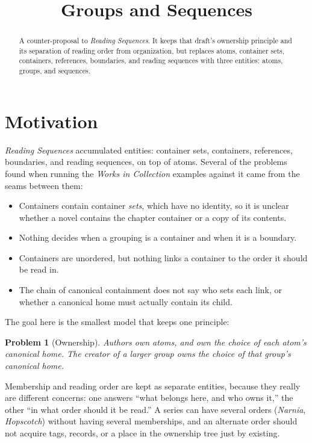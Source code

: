 \documentclass{amsart}
\title{Groups and Sequences}
\newtheorem*{prob}{Problem}
\theoremstyle{remark}
\begin{document}
\begin{abstract}
A counter-proposal to \emph{Reading Sequences}. It keeps that draft's ownership principle and its separation of reading order from organization, but replaces atoms, container sets, containers, references, boundaries, and reading sequences with three entities: atoms, groups, and sequences.
\end{abstract}
\maketitle

\section{Motivation}
\emph{Reading Sequences} accumulated entities: container sets, containers, references, boundaries, and reading sequences, on top of atoms. Several of the problems found when running the \emph{Works in Collection} examples against it came from the seams between them:
\begin{itemize}
  \item Containers contain container \emph{sets}, which have no identity, so it is unclear whether a novel contains the chapter container or a copy of its contents.
  \item Nothing decides when a grouping is a container and when it is a boundary.
  \item Containers are unordered, but nothing links a container to the order it should be read in.
  \item The chain of canonical containment does not say who sets each link, or whether a canonical home must actually contain its child.
\end{itemize}
The goal here is the smallest model that keeps one principle:
\begin{prob}[Ownership]
Authors own atoms, and own the choice of each atom's canonical home. The creator of a larger group owns the choice of that group's canonical home.
\end{prob}
Membership and reading order are kept as separate entities, because they really are different concerns: one answers ``what belongs here, and who owns it,'' the other ``in what order should it be read.'' A series can have several orders (\emph{Narnia}, \emph{Hopscotch}) without having several memberships, and an alternate order should not acquire tags, records, or a place in the ownership tree just by existing.
\end{document}
